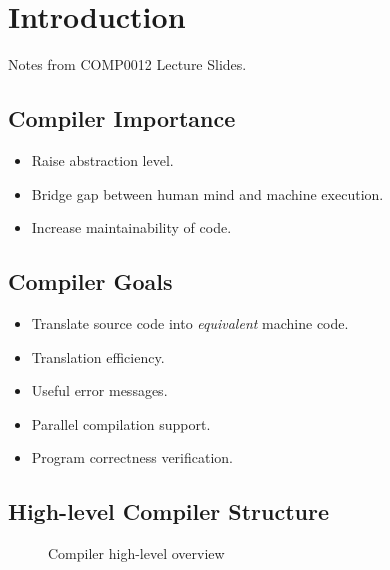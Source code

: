 \section{Introduction}

Notes from COMP0012 Lecture Slides.

\subsection{Compiler Importance}
\begin{itemize}
    \item Raise abstraction level.
    \item Bridge gap between human mind and machine execution.
    \item Increase maintainability of code.
\end{itemize}

\subsection{Compiler Goals}
\begin{itemize}
    \item Translate source code into \textit{equivalent} machine code.
    \item Translation efficiency.
    \item Useful error messages.
    \item Parallel compilation support.
    \item Program correctness verification.
\end{itemize}

\subsection{High-level Compiler Structure}
\begin{figure}[H]
    \centering
    \caption{Compiler high-level overview}
    \label{fig:compiler-high-level-overview}
\end{figure}

